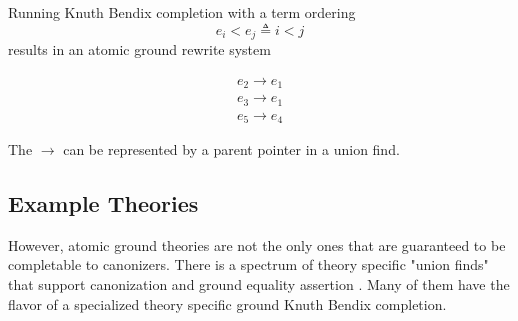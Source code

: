 \documentclass[sigconf]{acmart}
\begin{document}
Running Knuth Bendix completion with a term ordering $$e_i < e_j \triangleq i < j$$ results in an atomic ground rewrite system

\begin{equation}
\begin{split}
e_2 \rightarrow e_1 \\
e_3 \rightarrow e_1 \\
e_5 \rightarrow e_4
\end{split}
\end{equation}

The $\rightarrow$ can be represented by a parent pointer in a union find.



\subsection{Example Theories}

However, atomic ground theories are not the only ones that are guaranteed to be completable to canonizers. There is a spectrum of theory specific "union finds" that support canonization and ground equality assertion \cite{MARCHE1996253}. Many of them have the flavor of a specialized theory specific ground Knuth Bendix completion.
\end{document}
